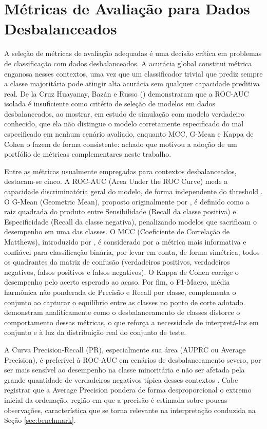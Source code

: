 \FloatBarrier
\section{Métricas de Avaliação para Dados Desbalanceados} \label{sec:metricas}

A seleção de métricas de avaliação adequadas é uma decisão crítica em problemas de classificação com dados desbalanceados. A acurácia global constitui métrica enganosa nesses contextos, uma vez que um classificador trivial que prediz sempre a classe majoritária pode atingir alta acurácia sem qualquer capacidade preditiva real. De la Cruz Huayanay, Bazán e Russo (\citeyear{delacruz2025}) demonstraram que a ROC-AUC isolada é insuficiente como critério de seleção de modelos em dados desbalanceados, ao mostrar, em estudo de simulação com modelo verdadeiro conhecido, que ela não distingue o modelo corretamente especificado do mal especificado em nenhum cenário avaliado, enquanto MCC, G-Mean e Kappa de Cohen o fazem de forma consistente: achado que motivou a adoção de um portfólio de métricas complementares neste trabalho.

Entre as métricas usualmente empregadas para contextos desbalanceados, destacam-se cinco. A ROC-AUC (Area Under the ROC Curve) mede a capacidade discriminatória geral do modelo, de forma independente do threshold \cite{fawcett2006}. O G-Mean (Geometric Mean), proposto originalmente por , é definido como a raiz quadrada do produto entre Sensibilidade (Recall da classe positiva) e Especificidade (Recall da classe negativa), penalizando modelos que sacrificam o desempenho em uma das classes. O MCC (Coeficiente de Correlação de Matthews), introduzido por , é considerado por  a métrica mais informativa e confiável para classificação binária, por levar em conta, de forma simétrica, todos os quadrantes da matriz de confusão (verdadeiros positivos, verdadeiros negativos, falsos positivos e falsos negativos). O Kappa de Cohen \cite{cohen1960} corrige o desempenho pelo acerto esperado ao acaso. Por fim, o F1-Macro, média harmônica não ponderada de Precisão e Recall por classe, complementa o conjunto ao capturar o equilíbrio entre as classes no ponto de corte adotado.  demonstram analiticamente como o desbalanceamento de classes distorce o comportamento dessas métricas, o que reforça a necessidade de interpretá-las em conjunto e à luz da distribuição real do conjunto de teste.

A Curva Precision-Recall (PR), especialmente sua área (AUPRC ou Average Precision), é preferível à ROC-AUC em cenários de desbalanceamento severo, por ser mais sensível ao desempenho na classe minoritária e não ser afetada pela grande quantidade de verdadeiros negativos típica desses contextos \cite{saito2015}. Cabe registrar que a Average Precision pondera de forma desproporcional o extremo inicial da ordenação, região em que a precisão é estimada sobre poucas observações, característica que se torna relevante na interpretação conduzida na Seção \ref{sec:benchmark}.

